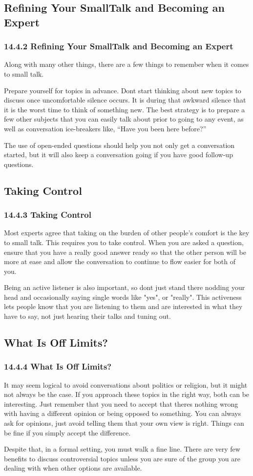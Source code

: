 \documentclass[aspectratio=169,UTF8,c]{beamer}%
\begin{document}
\subsection{Refining Your SmallTalk and Becoming an Expert}
\begin{frame}
	\frametitle{14.4.2 Refining Your SmallTalk and Becoming an Expert}
	\normalsize Along with many other things, there are a few things to remember when it comes to small talk.
	
	Prepare yourself for topics in advance. Dont start thinking about new topics to discuss once uncomfortable silence occurs. It is during that awkward silence that it is the worst time to think of something new. The best strategy is to prepare a few other subjects that you can easily talk about prior to going to any event, as well as conversation ice-breakers like, “Have you been here before?”
	
	The use of open-ended questions should help you not only get a conversation started, but it will also keep a conversation going if you have good follow-up questions.
\end{frame}
\subsection{Taking Control}
\begin{frame}
	\frametitle{14.4.3 Taking Control}
	Most experts agree that taking on the burden of other people's comfort is the key to small talk. This requires you to take control. When you are asked a question, ensure that you have a really good answer ready so that the other person will be more at ease and allow the conversation to continue to flow easier for both of you.
	
	Being an active listener is also important, so dont just stand there nodding your head and occasionally saying single words like "yes", or "really". This activeness lets people know that you are listening to them and are interested in what they have to say, not just hearing their talks and tuning out.
\end{frame}
\subsection{What Is Off Limits?}
\begin{frame}
	\frametitle{14.4.4 What Is Off Limits?}
	It may seem logical to avoid conversations about politics or religion, but it might not always be the case. If you approach these topics in the right way, both can be interesting. Just remember that you need to accept that theres nothing wrong with having a different opinion or being opposed to something. You can always ask for opinions, just avoid telling them that your own view is right. Things can be fine if you simply accept the difference.
	
	Despite that, in a formal setting, you must walk a fine line. There are very few benefits to discuss controversial topics unless you are sure of the group you are dealing with when other options are available.
\end{frame}
\end{document}
